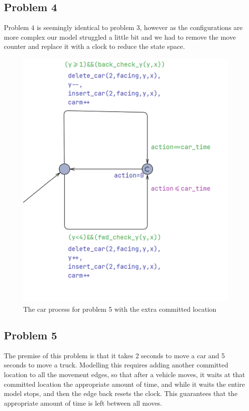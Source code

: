 \documentclass{article}
\begin{document}
\subsection{Problem 4}
Problem 4 is seemingly identical to problem 3, however as the configurations are more complex our model struggled a little bit and we had to remove the move counter and replace it with a clock to reduce the state space. 

\newpage
\begin{figure}[hbt!]
    \centering
    \includegraphics[width=0.75\linewidth]{images/timefix.png}
    \caption{The car process for problem 5 with the extra committed location}
\end{figure}


\subsection{Problem 5}
The premise of this problem is that it takes 2 seconds to move a car and 5 seconds to move a truck.
Modelling this requires adding another committed location to all the movement edges, so that after a vehicle moves, it waits at that committed location the appropriate amount of time, and while it waits the entire model stops, and then the edge back resets the clock. This guarantees that the appropriate amount of time is left between all moves.
\end{document}
